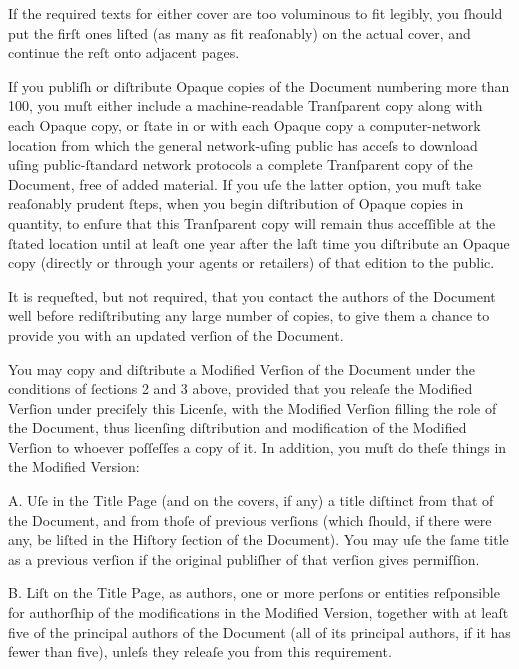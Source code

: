 If the required texts for either cover are too voluminous to fit 
legibly, you ſhould put the firſt ones liſted (as many as fit 
reaſonably) on the actual cover, and continue the reſt onto adjacent 
pages.

If you publiſh or diſtribute Opaque copies of the Document numbering 
more than 100, you muſt either include a machine-readable Tranſparent 
copy along with each Opaque copy, or ſtate in or with each Opaque copy a 
computer-network location from which the general network-uſing public 
has acceſs to download uſing public-ſtandard network protocols a 
complete Tranſparent copy of the Document, free of added material. If 
you uſe the latter option, you muſt take reaſonably prudent ſteps, when 
you begin diſtribution of Opaque copies in quantity, to enſure that this 
Tranſparent copy will remain thus acceſſible at the ſtated location 
until at leaſt one year after the laſt time you diſtribute an Opaque 
copy (directly or through your agents or retailers) of that edition to 
the public.

It is requeſted, but not required, that you contact the authors of the 
Document well before rediſtributing any large number of copies, to give 
them a chance to provide you with an updated verſion of the Document.


You may copy and diſtribute a Modified Verſion of the Document under the 
conditions of ſections 2 and 3 above, provided that you releaſe the 
Modified Verſion under preciſely this Licenſe, with the Modified Verſion 
filling the role of the Document, thus licenſing diſtribution and 
modification of the Modified Verſion to whoever poſſeſſes a copy of it. 
In addition, you muſt do theſe things in the Modified Version:

A. Uſe in the Title Page (and on the covers, if any) a title diſtinct
   from that of the Document, and from thoſe of previous verſions
   (which ſhould, if there were any, be liſted in the Hiſtory ſection
   of the Document). You may uſe the ſame title as a previous verſion
   if the original publiſher of that verſion gives permiſſion.

B. Liſt on the Title Page, as authors, one or more perſons or entities
   reſponsible for authorſhip of the modifications in the Modified
   Version, together with at leaſt five of the principal authors of the
   Document (all of its principal authors, if it has fewer than five),
   unleſs they releaſe you from this requirement.

